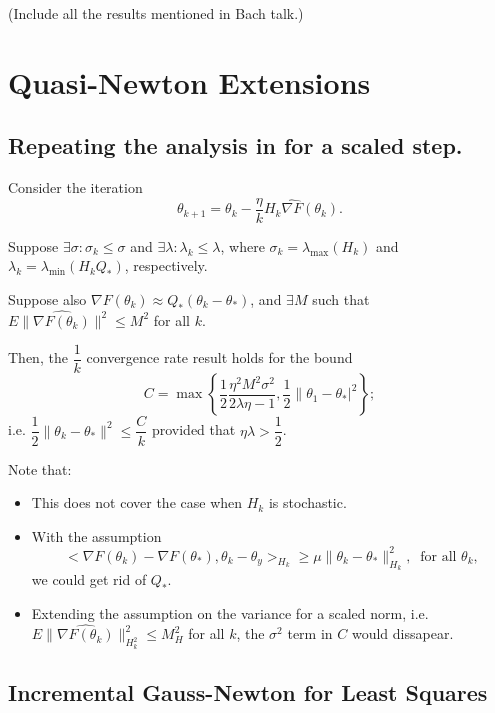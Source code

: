 \documentclass[12pt]{article}
\begin{document}
(Include all the results mentioned in Bach talk.)


\newpage%
\section{Quasi-Newton Extensions}

\subsection{Repeating the analysis in \cite{nemirovski:2009} for a scaled step.}
Consider the iteration
\[
 \theta_{k+1} = \theta_k - \frac{\eta}{k}H_k \hat{\nabla F}(\theta_k).
\]

Suppose $\exists \sigma : \sigma_k \leq \sigma$ and $\exists \lambda : \lambda_k \leq \lambda$, where $\sigma_k = \lambda_{\max}(H_k)$ and $\lambda_k = \lambda_{\min}(H_kQ_\ast)$, respectively.

Suppose also $\nabla F(\theta_k)\approx Q_\ast (\theta_k-\theta_\ast)$, and $\exists M$ such that $E\|\hat{\nabla F(\theta_k)}\|^2\leq M^2$ for all $k$.

\bigskip

\noindent
Then, the $\dfrac{1}{k}$ convergence rate result holds for the bound 
\[
  C = \max \left\lbrace \frac{1}{2}\frac{\eta^2M^2\sigma^2}{2\lambda\eta-1}, \frac{1}{2}\|\theta_1-\theta_\ast|^2 \right\rbrace;
\]
i.e. $\dfrac{1}{2}\|\theta_k-\theta_\ast\|^2 \leq \dfrac{C}{k}$ provided that $\eta\lambda > \dfrac{1}{2}$.

\bigskip

\noindent
Note that:
\begin{itemize}
 \item This does not cover the case when $H_k$ is stochastic.
 \item With the assumption
\[
 <\nabla F(\theta_k) - \nabla F(\theta_\ast), \theta_k-\theta_y >_{H_k} \geq \mu \|\theta_k-\theta_\ast\|_{H_k}^2, \ \mbox{ for all } \theta_k,
\]
we could get rid of $Q_\ast$.
 \item Extending the assumption on the variance for a scaled norm, i.e. $E\|\hat{\nabla F(\theta_k)}\|_{H_k^2}^2\leq M_H^2$ for all $k$, the $\sigma^2$ term in $C$ would dissapear.
\end{itemize}

\bigskip

\subsection{Incremental Gauss-Newton for Least Squares \cite{bertsekas} }
\end{document}
